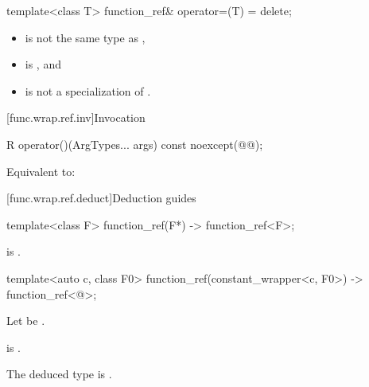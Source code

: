 %
\begin{itemdecl}
template<class T> function_ref& operator=(T) = delete;
\end{itemdecl}

\begin{itemdescr}
\pnum
\constraints
\begin{itemize}
\item {} is not the same type as ,
\item {} is , and
\item {} is not a specialization of .
\end{itemize}
\end{itemdescr}

[func.wrap.ref.inv]{Invocation}

%
\begin{itemdecl}
R operator()(ArgTypes... args) const noexcept(@@);
\end{itemdecl}

\begin{itemdescr}
\pnum
\effects
Equivalent to:
\end{itemdescr}

[func.wrap.ref.deduct]{Deduction guides}

\begin{itemdecl}
template<class F>
  function_ref(F*) -> function_ref<F>;
\end{itemdecl}

\begin{itemdescr}
\pnum
\constraints
{} is .
\end{itemdescr}

\begin{itemdecl}
template<auto c, class F0>
  function_ref(constant_wrapper<c, F0>) -> function_ref<@\seebelow@>;
\end{itemdecl}

\begin{itemdescr}
\pnum
Let  be .

\pnum
\constraints
{} is .

\pnum
\remarks
The deduced type is .
\end{itemdescr}

